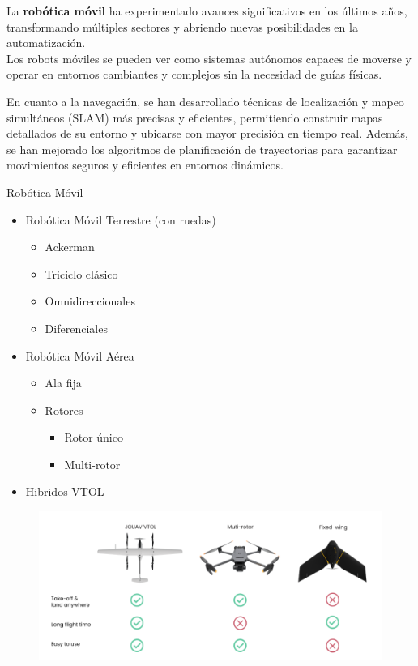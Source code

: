 \documentclass[
	11pt, %
]{beamer}
\begin{document}
\begin{frame}

  La \textbf{robótica móvil} ha experimentado avances significativos en los últimos años, transformando múltiples sectores y abriendo nuevas posibilidades en la automatización.\\
  Los robots móviles se pueden ver como sistemas autónomos capaces de moverse y operar en entornos cambiantes y complejos sin la necesidad de guías físicas.\\
  
\bigskip %

En cuanto a la navegación, se han desarrollado técnicas de localización y mapeo simultáneos (SLAM) más precisas y eficientes, permitiendo construir mapas detallados de su entorno y ubicarse con mayor precisión en tiempo real. Además, se han mejorado los algoritmos de planificación de trayectorias para garantizar movimientos seguros y eficientes en entornos dinámicos.\\
\end{frame}
\begin{frame}
Robótica Móvil
\begin{itemize}
\item <1-> Robótica Móvil Terrestre (con ruedas)\\
  \begin{itemize}
  \item Ackerman
  \item Triciclo clásico
  \item Omnidireccionales
  \item Diferenciales
  \end{itemize}
\item <2-> Robótica Móvil Aérea\\
  \begin{itemize}
  \item Ala fija
  \item Rotores
    \begin{itemize}
    \item Rotor único
    \item Multi-rotor
    \end{itemize}
  \end{itemize}
  \item <3-> Hibridos VTOL
\end{itemize}
\end{frame}

\begin{frame}
  \begin{figure}
    \includegraphics[width=0.9\linewidth]{drones.png}
  \end{figure}
\end{frame}
\end{document}

